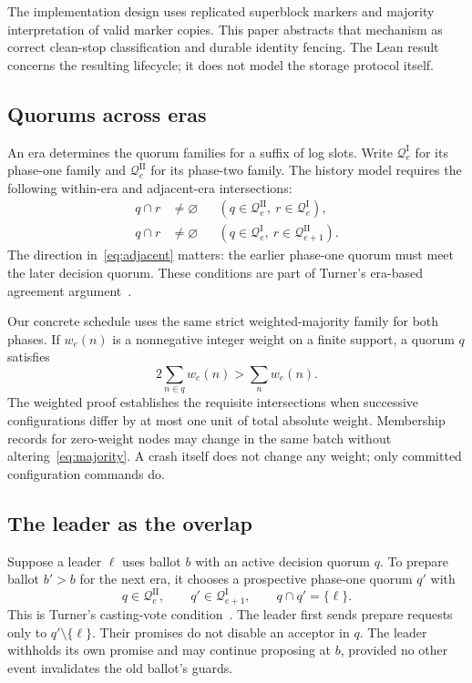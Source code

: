 \documentclass[10pt,journal,letterpaper]{IEEEtran}
\newcommand{\QI}{\mathcal{Q}^{\mathrm I}}
\newcommand{\QII}{\mathcal{Q}^{\mathrm {II}}}
\begin{document}
The implementation design uses replicated superblock markers and majority interpretation of valid marker copies. This paper abstracts that mechanism as correct clean-stop classification and durable identity fencing. The Lean result concerns the resulting lifecycle; it does not model the storage protocol itself.

\subsection{Quorums across eras}
An era determines the quorum families for a suffix of log slots. Write $\QI_e$ for its phase-one family and $\QII_e$ for its phase-two family. The history model requires the following within-era and adjacent-era intersections:
\begin{align}
q\cap r&\ne\varnothing
&& (q\in\QII_e,\ r\in\QI_e),\label{eq:same}\\
q\cap r&\ne\varnothing
&& (q\in\QI_e,\ r\in\QII_{e+1}).\label{eq:adjacent}
\end{align}
The direction in~\eqref{eq:adjacent} matters: the earlier phase-one quorum must meet the later decision quorum. These conditions are part of Turner's era-based agreement argument~\cite{turner}.

Our concrete schedule uses the same strict weighted-majority family for both phases. If $w_e(n)$ is a nonnegative integer weight on a finite support, a quorum $q$ satisfies
\begin{equation}
2\sum_{n\in q}w_e(n)>\sum_n w_e(n).
\label{eq:majority}
\end{equation}
The weighted proof establishes the requisite intersections when successive configurations differ by at most one unit of total absolute weight. Membership records for zero-weight nodes may change in the same batch without altering~\eqref{eq:majority}. A crash itself does not change any weight; only committed configuration commands do.

\subsection{The leader as the overlap}
Suppose a leader $\ell$ uses ballot $b$ with an active decision quorum $q$. To prepare ballot $b'>b$ for the next era, it chooses a prospective phase-one quorum $q'$ with
\begin{equation}
q\in\QII_e,\qquad q'\in\QI_{e+1},\qquad q\cap q'=\{\ell\}.
\label{eq:leader}
\end{equation}
This is Turner's casting-vote condition~\cite{turner}. The leader first sends prepare requests only to $q'\setminus\{\ell\}$. Their promises do not disable an acceptor in $q$. The leader withholds its own promise and may continue proposing at $b$, provided no other event invalidates the old ballot's guards.
\end{document}
